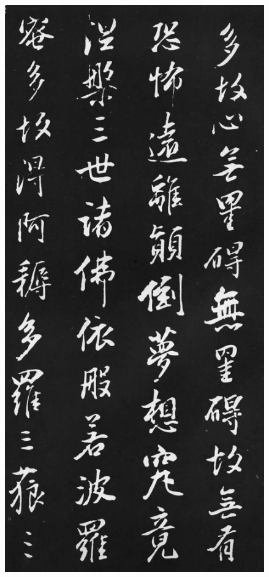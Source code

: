 \documentclass[a4paper,twoside]{article}
\begin{document}
\begin{figure}[ht]
\centering
\includegraphics[width=11.2cm]{images/dongqichang-5}
\end{figure}
\end{document}

